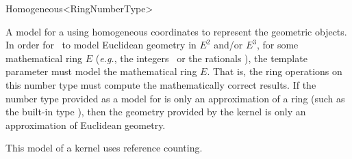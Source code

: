 \begin{ccRefClass}{Homogeneous<RingNumberType>}

\ccDefinition
A model for a  using homogeneous coordinates to represent the
geometric objects.  In order for \ccRefName\ to model Euclidean geometry
in $E^2$ and/or $E^3$, for some mathematical ring $E$ (\textit{e.g.},
the integers \Z\ or the rationals \Q), the template parameter 
must model the mathematical ring $E$.  That is, the ring operations on this
number type must compute the mathematically correct results.  If the number
type provided as a model for  is only an approximation of a
ring (such as the built-in type ), then the geometry provided by
the kernel is only an approximation of Euclidean geometry.  

\ccIsModel
{}

\ccTypes
{}
\ccGlue
{}

\ccImplementation
This model of a kernel uses reference counting.

\ccSeeAlso
{} \\
 \\
 \\

\end{ccRefClass}
